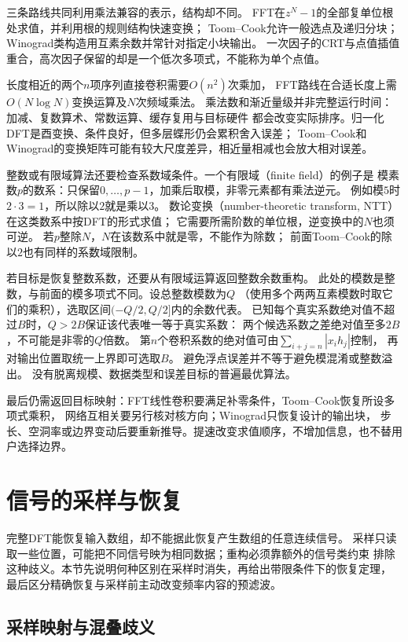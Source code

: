 三条路线共同利用乘法兼容的表示，结构却不同。
FFT在$z^N-1$的全部复单位根处求值，并利用根的规则结构快速变换；
Toom--Cook允许一般选点及递归分块；Winograd类构造用互素余数并常针对指定小块输出。
一次因子的CRT与点值插值重合，高次因子保留的却是一个低次多项式，不能称为单个点值。

长度相近的两个$n$项序列直接卷积需要$O(n^2)$次乘加，
FFT路线在合适长度上需$O(N\log N)$变换运算及$N$次频域乘法。
乘法数和渐近量级并非完整运行时间：加减、复数算术、常数运算、缓存复用与目标硬件
都会改变实际排序。归一化DFT是酉变换、条件良好，但多层蝶形仍会累积舍入误差；
Toom--Cook和Winograd的变换矩阵可能有较大尺度差异，相近量相减也会放大相对误差。

整数或有限域算法还要检查系数域条件。一个有限域（finite field）的例子是
模素数$p$的数系：只保留$0,\ldots,p-1$，加乘后取模，非零元素都有乘法逆元。
例如模$5$时$2\cdot3=1$，所以除以$2$就是乘以$3$。
数论变换（number-theoretic transform, NTT）在这类数系中按DFT的形式求值；
它需要所需阶数的单位根，逆变换中的$N$也须可逆。
若$p$整除$N$，$N$在该数系中就是零，不能作为除数；
前面Toom--Cook的除以$2$也有同样的系数域限制。

若目标是恢复整数系数，还要从有限域运算返回整数余数重构。
此处的模数是整数，与前面的模多项式不同。设总整数模数为$Q$
（使用多个两两互素模数时取它们的乘积），选取区间$(-Q/2,Q/2]$内的余数代表。
已知每个真实系数绝对值不超过$B$时，$Q>2B$保证该代表唯一等于真实系数：
两个候选系数之差绝对值至多$2B$，不可能是非零的$Q$倍数。
第$n$个卷积系数的绝对值可由$\sum_{i+j=n}|x_i h_j|$控制，
再对输出位置取统一上界即可选取$B$。
避免浮点误差并不等于避免模混淆或整数溢出。
没有脱离规模、数据类型和误差目标的普遍最优算法。

最后仍需返回目标映射：FFT线性卷积要满足补零条件，Toom--Cook恢复所设多项式乘积，
网络互相关要另行核对核方向；Winograd只恢复设计的输出块，
步长、空洞率或边界变动后要重新推导。提速改变求值顺序，不增加信息，也不替用户选择边界。

\section{信号的采样与恢复}
\label{sec:signal-analysis-sampling}

完整DFT能恢复输入数组，却不能据此恢复产生数组的任意连续信号。
采样只读取一些位置，可能把不同信号映为相同数据；重构必须靠额外的信号类约束
排除这种歧义。本节先说明何种区别在采样时消失，再给出带限条件下的恢复定理，
最后区分精确恢复与采样前主动改变频率内容的预滤波。

\subsection{采样映射与混叠歧义}
\label{sec:signal-sampling-ambiguity}

